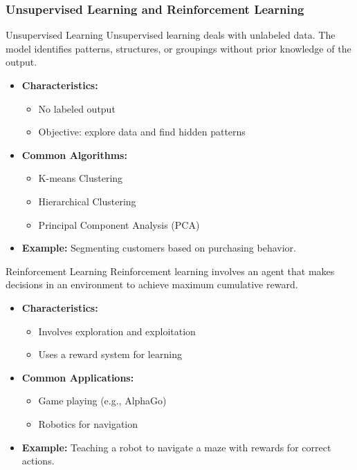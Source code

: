 \documentclass[aspectratio=169]{beamer}
\begin{document}
\begin{frame}[fragile]
    \frametitle{Unsupervised Learning and Reinforcement Learning}
    \begin{block}{Unsupervised Learning}
        Unsupervised learning deals with unlabeled data. The model identifies patterns, structures, or groupings without prior knowledge of the output.
    \end{block}

    \begin{itemize}
        \item \textbf{Characteristics:}
        \begin{itemize}
            \item No labeled output
            \item Objective: explore data and find hidden patterns
        \end{itemize}

        \item \textbf{Common Algorithms:}
        \begin{itemize}
            \item K-means Clustering
            \item Hierarchical Clustering
            \item Principal Component Analysis (PCA)
        \end{itemize}
        
        \item \textbf{Example:}
        Segmenting customers based on purchasing behavior.
    \end{itemize}
    
    \begin{block}{Reinforcement Learning}
        Reinforcement learning involves an agent that makes decisions in an environment to achieve maximum cumulative reward.
    \end{block}
    
    \begin{itemize}
        \item \textbf{Characteristics:}
        \begin{itemize}
            \item Involves exploration and exploitation
            \item Uses a reward system for learning
        \end{itemize}

        \item \textbf{Common Applications:}
        \begin{itemize}
            \item Game playing (e.g., AlphaGo)
            \item Robotics for navigation
        \end{itemize}

        \item \textbf{Example:}
        Teaching a robot to navigate a maze with rewards for correct actions.
    \end{itemize}
\end{frame}
\end{document}
